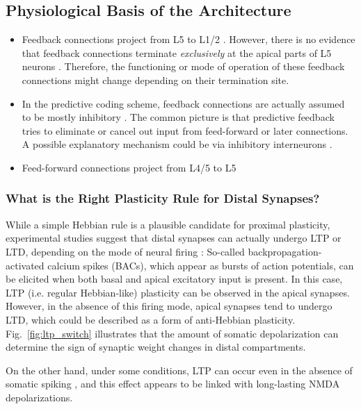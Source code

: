 \documentclass[10pt,a4paper,draft]{article}
\begin{document}
\subsection{Physiological Basis of the Architecture}
\begin{itemize}
	\item Feedback connections project from L5 to L1/2 \cite{Barbas_2015}. However, there is no evidence that feedback connections terminate \emph{exclusively} at the apical parts of L5 neurons \cite{Larkum_2018}. Therefore, the functioning or mode of operation of these feedback connections might change depending on their termination site.
	\item In the predictive coding scheme, feedback connections are actually assumed to be mostly inhibitory \cite{Bastos_2012}. The common picture is that predictive feedback tries to eliminate or cancel out input from feed-forward or later connections. A possible explanatory mechanism could be via inhibitory interneurons \cite{Meyer_2011}.
	\item Feed-forward connections project from L4/5 to L5 \cite{Barbas_2015}
\end{itemize}

\subsubsection{What is the Right Plasticity Rule for Distal Synapses?}
While a simple Hebbian rule is a plausible candidate for proximal plasticity, experimental studies suggest that distal synapses can actually undergo LTP or LTD, depending on the mode of neural firing \cite{Sjoestroem_2006,Letzkus_2006}: So-called backpropagation-activated calcium spikes (BACs), which appear as bursts of action potentials, can be elicited when both basal and apical excitatory input is present. In this case, LTP (i.e. regular Hebbian-like) plasticity can be observed in the apical synapses. However, in the absence of this firing mode, apical synapses tend to undergo LTD, which could be described as a form of anti-Hebbian plasticity. Fig.~\ref{fig:ltp_switch} illustrates that the amount of somatic depolarization can determine the sign of synaptic weight changes in distal compartments.

On the other hand, under some conditions, LTP can occur even in the absence of somatic spiking \cite{Gambino_2014}, and this effect appears to be linked with long-lasting NMDA depolarizations.
\end{document}
